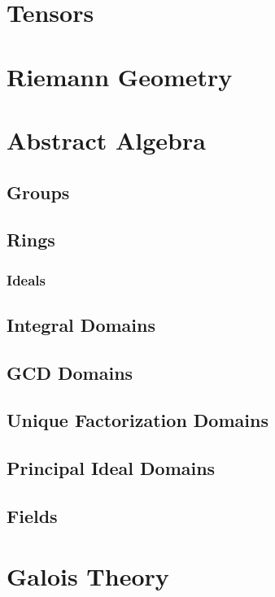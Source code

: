 \documentclass[12pt, english]{book}
\theoremstyle{break}
\theoremstyle{plain}
\begin{document}
	
	\part{Tensors}
	
	
	\part{Riemann Geometry}
	
	
	\part{Abstract Algebra}
	
	\chapter{Groups}
	
	
	\chapter{Rings}
	
	\section{Ideals}
	
	\chapter{Integral Domains}
	
	\chapter{GCD Domains}
	
	\chapter{Unique Factorization Domains}
	
	\chapter{Principal Ideal Domains}
	
	\chapter{Fields}
	
	
	\part{Galois Theory}
	
\end{document}
